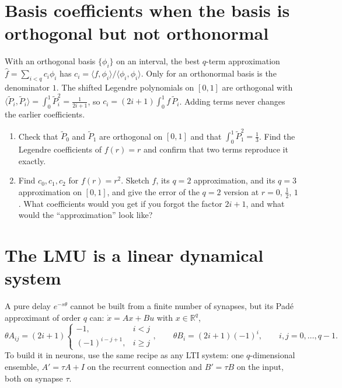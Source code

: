 \documentclass[11pt,letterpaper]{article}
\begin{document}
\section{Basis coefficients when the basis is orthogonal but not orthonormal}

\begin{idea}
With an orthogonal basis $\{\phi_i\}$ on an interval, the best $q$-term approximation $\hat f = \sum_{i<q} c_i\phi_i$ has $c_i = \langle f, \phi_i\rangle / \langle\phi_i, \phi_i\rangle$. Only for an orthonormal basis is the denominator $1$. The shifted Legendre polynomials on $[0, 1]$ are orthogonal with $\langle\tilde P_i, \tilde P_i\rangle = \int_0^1 \tilde P_i^2 = \frac{1}{2i + 1}$, so $c_i = (2i + 1)\int_0^1 f\,\tilde P_i$. Adding terms never changes the earlier coefficients.
\end{idea}

\begin{enumerate}
\item Check that $\tilde P_0$ and $\tilde P_1$ are orthogonal on $[0, 1]$ and that $\int_0^1 \tilde P_1^2 = \frac13$. Find the Legendre coefficients of $f(r) = r$ and confirm that two terms reproduce it exactly.
\item Find $c_0, c_1, c_2$ for $f(r) = r^2$. Sketch $f$, its $q = 2$ approximation, and its $q = 3$ approximation on $[0, 1]$, and give the error of the $q = 2$ version at $r = 0$, $\frac12$, $1$. What coefficients would you get if you forgot the factor $2i + 1$, and what would the ``approximation'' look like?
\end{enumerate}

\section{The LMU is a linear dynamical system}

\begin{idea}
A pure delay $e^{-s\theta}$ cannot be built from a finite number of synapses, but its Pad\'e approximant of order $q$ can: $\dot x = Ax + Bu$ with $x \in \mathbb{R}^q$,
\[
\theta A_{ij} = (2i + 1)\begin{cases} -1, & i < j\\ (-1)^{i - j + 1}, & i \ge j\end{cases}, \qquad \theta B_i = (2i + 1)(-1)^i, \qquad i, j = 0, \dots, q - 1.
\]
To build it in neurons, use the same recipe as any LTI system: one $q$-dimensional ensemble, $A' = \tau A + I$ on the recurrent connection and $B' = \tau B$ on the input, both on synapse $\tau$.
\end{idea}
\end{document}
